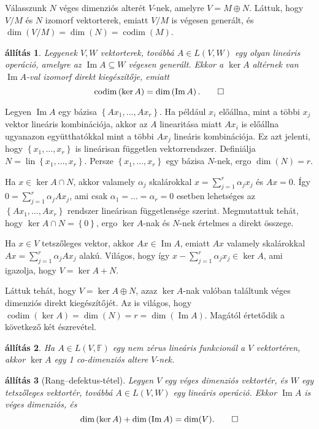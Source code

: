\documentclass[a4paper, showtrims]{memoir}
\makeatletter
\renewenvironment{proof}[1][\proofname]
    {\par\pushQED{\qed}%
    \normalfont \topsep6\p@\@plus6\p@\relax
    \trivlist
    \item[\hskip\labelsep
        \itshape
    #1\@addpunct{:}]\ignorespaces}
    {\popQED\endtrivlist\@endpefalse}
\theoremstyle{plain}
\newtheorem{proposition}{állítás}[chapter]
\theoremstyle{remark}
\theoremstyle{definition}
\DeclareMathOperator{\lin}{lin}
\DeclareMathOperator{\codim}{codim}
\DeclareMathOperator{\im}{Im}
\makeatother
\begin{document}
\begin{proof}
	Válasszunk $N$ véges dimenziós alterét $V$-nek,
	amelyre $V=M\oplus N$.
	Láttuk, hogy $V/M$ és $N$ izomorf vektorterek,
	emiatt $V/M$ is végesen generált, és
	$\dim \left( V/M \right)=\dim(N)=\codim(M)$.
\end{proof}
\begin{proposition}
	Legyenek $V,W$ vektorterek,
	továbbá $A\in L\left( V,W \right)$ egy olyan lineáris operáció,
	amelyre az $\im A\subseteq W$ végesen generált.
	Ekkor a $\ker A$ altérnek van $\im A$-val izomorf direkt kiegészítője, emiatt
	\[
		\codim\left( \ker A \right)=\dim\left( \im A \right).\qedhere
	\]
\end{proposition}
\begin{proof}
	Legyen $\im A$ egy bázisa $\left\{ Ax_1,\ldots,Ax_r \right\}$.
    Ha például $x_i$ előállna, mint a többi $x_j$ vektor lineáris kombinációja,
    akkor az $A$ linearitása miatt $Ax_i$ is előállna ugyanazon együtthatókkal mint a többi $Ax_j$
    lineáris kombinációja.
    Ez azt jelenti, hogy $\left\{ x_1,\ldots,x_r \right\}$ is lineárisan független vektorrendszer.
	Definiálja $N=\lin\left\{ x_1,\ldots,x_r \right\}$.
    Persze $\left\{ x_1,\ldots,x_r \right\}$ egy bázisa $N$-nek,
    ergo $\dim(N)=r$.

	Ha $x\in\ker A\cap N$, akkor valamely $\alpha_j$ skalárokkal
	$x=\sum_{j=1}^r\alpha_jx_j$ és $Ax=0$.
	Így $0=\sum_{j=1}^r\alpha_jAx_j$, ami csak $\alpha_1=\dots=\alpha_r=0$
	esetben lehetséges az $\left\{ Ax_1,\ldots,Ax_r \right\}$ rendszer lineárisan függetlensége szerint.
    Megmutattuk tehát, hogy $\ker A\cap N=\left\{ 0 \right\}$, ergo $\ker A$-nak és $N$-nek értelmes a direkt összege.

	Ha $x\in V$ tetszőleges vektor, akkor $Ax\in\im A$, emiatt
	$Ax$ valamely skalárokkal $Ax=\sum_{j=1}^r\alpha_jAx_j$ alakú.
	Világos, hogy így $x-\sum_{j=1}^r\alpha_jx_j\in\ker A$,
	ami igazolja, hogy $V=\ker A+N$.

	Láttuk tehát, hogy $V=\ker A\oplus N$, azaz $\ker A$-nak valóban találtunk véges dimenziós direkt kiegészítőjét.
	Az is világos, hogy $\codim\left( \ker A \right)=\dim(N)=r=\dim\left( \im A \right)$.
\end{proof}
Magától értetődik a következő két észrevétel.
\begin{proposition}
	Ha $A\in L\left( V,\mathbb{F} \right)$ egy nem zérus lineáris funkcionál a $V$ vektortéren,
	akkor $\ker A$ egy 1 co-dimenziós altere $V$-nek.
\end{proposition}
\begin{proposition}[Rang--defektus-tétel]
	Legyen $V$ egy véges dimenziós vektortér,
	és $W$ egy tetszőleges vektortér,
	továbbá $A\in L\left( V,W \right)$ egy lineáris operáció.
	Ekkor
	$\im A$ is véges dimenziós, és
	\[
		\dim\left( \ker A \right)+\dim\left( \im A \right)=\dim(V).\qedhere
	\]
\end{proposition}
\end{document}

